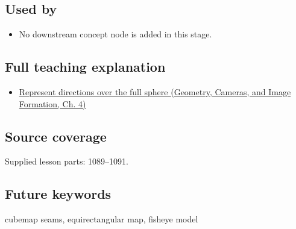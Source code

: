 \subsection{Used by}\label{appendix-fc99ad39f351-used-by}

\hypertarget{appendix-fc99ad39f351-used-by}{}

\begin{itemize}
\tightlist
\item
  No downstream concept node is added in this stage.
\end{itemize}

\subsection{Full teaching explanation}\label{appendix-fc99ad39f351-full-teaching-explanation}

\hypertarget{appendix-fc99ad39f351-full-teaching-explanation}{}

\begin{itemize}
\tightlist
\item
  \href{../03-Geometry-Cameras-and-Image-Formation/main.pdf\#nameddest=02-foundations-ii-ch035-represent-directions-over-the-full-sphere}{Represent directions over the full sphere (Geometry, Cameras, and Image Formation, Ch. 4)}
\end{itemize}

\subsection{Source coverage}\label{appendix-fc99ad39f351-source-coverage}

\hypertarget{appendix-fc99ad39f351-source-coverage}{}

Supplied lesson parts: 1089--1091.

\subsection{Future keywords}\label{appendix-fc99ad39f351-future-keywords}

\hypertarget{appendix-fc99ad39f351-future-keywords}{}

cubemap seams, equirectangular map, fisheye model
